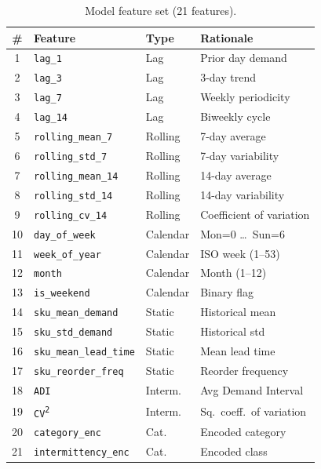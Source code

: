 \documentclass[11pt,letterpaper]{article}
\begin{document}
\begin{table}[H]
\centering
\caption{Model feature set (21 features).}
\label{tab:features}
\small
\begin{tabular}{@{}clll@{}}
\toprule
\textbf{\#} & \textbf{Feature} & \textbf{Type} & \textbf{Rationale} \\
\midrule
1  & \texttt{lag\_1}            & Lag       & Prior day demand \\
2  & \texttt{lag\_3}            & Lag       & 3-day trend \\
3  & \texttt{lag\_7}            & Lag       & Weekly periodicity \\
4  & \texttt{lag\_14}           & Lag       & Biweekly cycle \\
5  & \texttt{rolling\_mean\_7}  & Rolling   & 7-day average \\
6  & \texttt{rolling\_std\_7}   & Rolling   & 7-day variability \\
7  & \texttt{rolling\_mean\_14} & Rolling   & 14-day average \\
8  & \texttt{rolling\_std\_14}  & Rolling   & 14-day variability \\
9  & \texttt{rolling\_cv\_14}   & Rolling   & Coefficient of variation \\
10 & \texttt{day\_of\_week}     & Calendar  & Mon=0 \ldots\ Sun=6 \\
11 & \texttt{week\_of\_year}    & Calendar  & ISO week (1--53) \\
12 & \texttt{month}             & Calendar  & Month (1--12) \\
13 & \texttt{is\_weekend}       & Calendar  & Binary flag \\
14 & \texttt{sku\_mean\_demand} & Static    & Historical mean \\
15 & \texttt{sku\_std\_demand}  & Static    & Historical std \\
16 & \texttt{sku\_mean\_lead\_time} & Static & Mean lead time \\
17 & \texttt{sku\_reorder\_freq} & Static   & Reorder frequency \\
18 & \texttt{ADI}               & Interm.   & Avg Demand Interval \\
19 & \texttt{CV\textsuperscript{2}} & Interm. & Sq.\ coeff.\ of variation \\
20 & \texttt{category\_enc}     & Cat.      & Encoded category \\
21 & \texttt{intermittency\_enc} & Cat.     & Encoded class \\
\bottomrule
\end{tabular}
\end{table}
\end{document}
